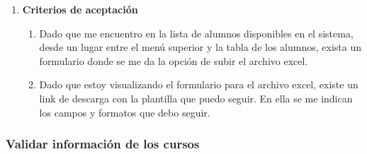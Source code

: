 \begin{enumerate}
\begin{enumerate}
			\item \textbf{Criterios de aceptación}
				\begin{enumerate}
					\item Dado que me encuentro en la lista de alumnos disponibles en el sistema, desde un lugar entre el menú superior y la tabla de los alumnos, exista un formulario donde se me da la opción de subir el archivo excel.
					\item Dado que estoy visualizando el formulario para el archivo excel, existe un link de descarga con la plantilla que puedo seguir. En ella se me indican los campos y formatos que debo seguir.
				\end{enumerate}
		\end{enumerate}
\end{enumerate}

\subsubsection{Validar información de los cursos}

